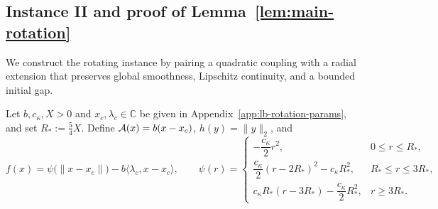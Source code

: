 \subsection{Instance II and proof of Lemma~\ref{lem:main-rotation}}
\label{subsec:lb-rotation}

We construct the rotating instance by pairing a quadratic coupling with a
radial extension that preserves global smoothness, Lipschitz continuity, and a
bounded initial gap.

\begin{example}
\label{ex:rotation}
Let \(b,c_\kappa,X>0\) and \(x_c,\lambda_c\in\mathbb C\) be given in
Appendix~\ref{app:lb-rotation-params}, and set \(R_*:=\frac54X\). Define
\(\mathcal{A}(x)=b(x-x_c)\), \(h(y)=\|y\|_2\), and
\[
f(x)=\psi\bigl(\|x-x_c\|\bigr)-b\langle\lambda_c,x-x_c\rangle,
\qquad
\psi(r)=
\begin{cases}
-\dfrac{c_\kappa}{2}r^2, & 0\le r\le R_*,\\[4pt]
\dfrac{c_\kappa}{2}(r-2R_*)^2-c_\kappa R_*^2, & R_*\le r\le3R_*,\\[4pt]
c_\kappa R_*(r-3R_*)-\dfrac{c_\kappa}{2}R_*^2, & r\ge3R_*.
\end{cases}
\]
\end{example}

